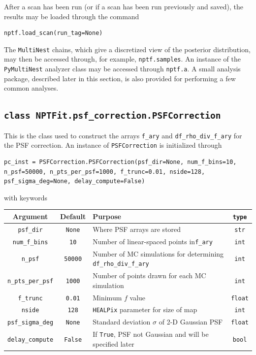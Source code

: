 After a scan has been run (or if a scan has been run previously and saved), the results may be loaded through the command
\begin{lstlisting}
nptf.load_scan(run_tag=None)
\end{lstlisting}
The \texttt{MultiNest} chains, which give a discretized view of the posterior distribution, may then be accessed through, for example, \lstinline{nptf.samples}.  An instance of the \texttt{PyMultiNest} analyzer class may be accessed through \lstinline{nptf.a}.  A small analysis package, described later in this section, is also provided for performing a few common analyses.  
 
\subsection*{ \lstinline{class NPTFit.psf_correction.PSFCorrection} }

This is the class used to construct the arrays \lstinline{f_ary} and \lstinline{df_rho_div_f_ary} for the PSF correction.  An instance of \lstinline{PSFCorrection} is initialized through 
\begin{lstlisting}
pc_inst = PSFCorrection.PSFCorrection(psf_dir=None, num_f_bins=10, n_psf=50000, n_pts_per_psf=1000, f_trunc=0.01, nside=128, psf_sigma_deg=None, delay_compute=False)
\end{lstlisting}
with keywords

\begin{center}
\begin{tabular}{ ccC{8.5cm}c }
\toprule
Argument &  Default & Purpose & \lstinline!type! \\ 
\midrule
\lstinline!psf_dir! & \lstinline!None!  & Where PSF arrays are stored  & \lstinline!str!  \\  
\lstinline!num_f_bins! & \lstinline!10! & Number of linear-spaced points in\lstinline!f_ary!  & \lstinline!int!  \\  
\lstinline!n_psf! & \lstinline!50000! & Number of MC simulations for determining \lstinline!df_rho_div_f_ary!  & \lstinline!int!  \\  
\lstinline!n_pts_per_psf! & \lstinline!1000! & Number of points drawn for each MC simulation & \lstinline!int! \\  
\lstinline!f_trunc! & \lstinline!0.01! & Minimum $f$ value & \lstinline!float!  \\  
\lstinline!nside! & \lstinline!128! & \lstinline!HEALPix! parameter for size of map  & \lstinline!int!  \\ 
\lstinline!psf_sigma_deg! & \lstinline!None! & Standard deviation $\sigma$ of 2-D Gaussian PSF  & \lstinline!float!  \\ 
\lstinline!delay_compute! & \lstinline!False! & If \lstinline!True!, PSF not Gaussian and will be specified later  & \lstinline!bool!  \\ 
\bottomrule
\end{tabular}
\end{center}

